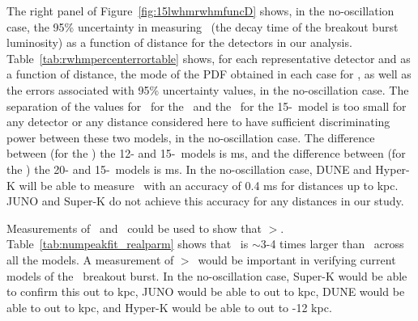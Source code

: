 The right panel of Figure~\ref{fig:15lwhmrwhmfuncD} 
shows, in the no-oscillation case, the 95\% uncertainty in
measuring \tfall\ (the decay time of the breakout burst luminosity) 
as a function of distance for the detectors in our analysis. 
Table~\ref{tab:rwhmpercenterrortable} shows, for each representative
detector and as a function of distance, the mode of the PDF obtained
in each case for \tfall, as well as the 
errors associated with 95\% uncertainty values, in the no-oscillation case.
The separation of the values for \tfall\ for the \ls\ and the \shen\
for the 15-\Msol\ 
model is too small for any detector or any distance
considered here to have sufficient discriminating power between these
two models, in the no-oscillation case.  
The difference between (for the \ls) the 12- and
15-\Msol\ models is \abt 0.4 ms, and the difference between (for the
\ls) the 20- and 15-\Msol\ models is \abt 0.9 ms. In the
no-oscillation case, DUNE and Hyper-K will be able to
measure \tfall\ with an accuracy of 0.4 ms for distances up to 
kpc.  JUNO and
Super-K do not achieve this accuracy for any distances in our study.

Measurements of \trise\ and \tfall\ could be used
to show that \tfall$>$\trise.  Table~\ref{tab:numpeakfit_realparm}
shows that \tfall\ is $\sim$3-4 times larger than \trise\ across all
the models.  A measurement of \tfall$>$\trise\ would be important in
verifying current models of the \nue\ breakout burst.   In the
no-oscillation case, Super-K would be able to confirm this out to \abt
2 kpc, JUNO 
would be able to out to \abt 3 kpc, 
DUNE would be able to out to  kpc,  and Hyper-K would be able to
out to \abt 11-12 kpc.



